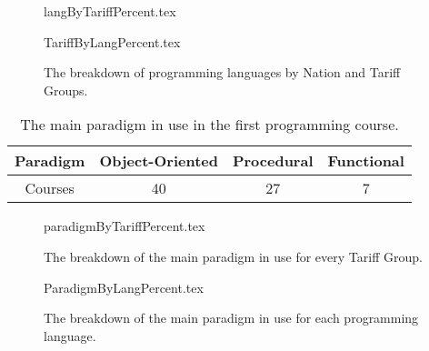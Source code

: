 \documentclass{sig-alternate}
\begin{document}
\begin{figure}
\begin{center}
{langByTariffPercent.tex}
\end{center}
%
\begin{center}
{TariffByLangPercent.tex}
\end{center}
\caption{The breakdown of programming languages by Nation and Tariff Groups.\label{fig;LangTariff}}
\end{figure}


\begin{table}[]
\centering
\caption{The main paradigm in use in the first programming course.}
\label{tab:paradigm}
\begin{tabular}{cccc}
\hline
Paradigm & Object-Oriented & Procedural & Functional \\ \hline
Courses  & 40              & 27         & 7          \\ \hline
\end{tabular}
\end{table}

\clearpage

\begin{figure}
\begin{center}
{paradigmByTariffPercent.tex}
\end{center}
\caption{The breakdown of the main paradigm in use for every Tariff Group.}
\end{figure}

%


\begin{figure}
\begin{center}
{ParadigmByLangPercent.tex}
\end{center}\vskip-18pt
\caption{The breakdown of the main paradigm in use for each programming language.}
\end{figure}
\end{document}

